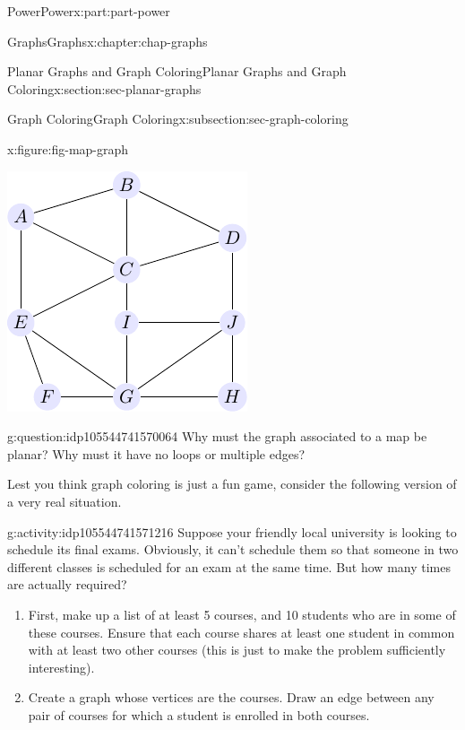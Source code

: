 \documentclass[oneside,10pt,]{book}
\numberwithin{equation}{section}
\begin{document}
\begin{partptx}{Power}{}{Power}{}{}{x:part:part-power}
\begin{chapterptx}{Graphs}{}{Graphs}{}{}{x:chapter:chap-graphs}
\begin{sectionptx}{Planar Graphs and Graph Coloring}{}{Planar Graphs and Graph Coloring}{}{}{x:section:sec-planar-graphs}
\begin{subsectionptx}{Graph Coloring}{}{Graph Coloring}{}{}{x:subsection:sec-graph-coloring}
\begin{figureptx}{}{x:figure:fig-map-graph}{}
\begin{image}{0.25}{0.5}{0.25}
\includegraphics[width=\linewidth]{./images/map-graph.pdf}
\end{image}%
\tcblower
\end{figureptx}%
\begin{question}{}{g:question:idp105544741570064}%
Why must the graph associated to a map be planar? Why must it have no loops or multiple edges?%
\end{question}
Lest you think graph coloring is just a fun game, consider the following version of a very real situation.%
\begin{activity}{}{g:activity:idp105544741571216}%
Suppose your friendly local university is looking to schedule its final exams. Obviously, it can't schedule them so that someone in two different classes is scheduled for an exam at the same time. But how many times are actually required?%
%
\begin{enumerate}
\item{}First, make up a list of at least 5 courses, and 10 students who are in some of these courses. Ensure that each course shares at least one student in common with at least two other courses (this is just to make the problem sufficiently interesting).%
\item{}Create a graph whose vertices are the courses. Draw an edge between any pair of courses for which a student is enrolled in both courses.%

\end{enumerate}
\end{activity}
\end{subsectionptx}
\end{sectionptx}
\end{chapterptx}
\end{partptx}
\end{document}
